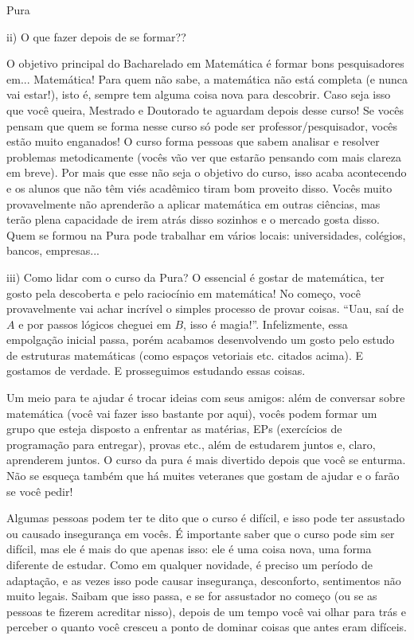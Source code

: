 \begin{subsecao}{Pura}
\begin{itemize}
\end{itemize}
ii) O que fazer depois de se formar??

O objetivo principal do Bacharelado em Matemática é formar bons pesquisadores
em... Matemática! Para quem não sabe, a matemática não está completa (e nunca
vai estar!), isto é, sempre tem alguma coisa nova para descobrir. Caso seja isso
que você queira, Mestrado e Doutorado te aguardam depois desse curso! Se vocês
pensam que quem se forma nesse curso só pode ser professor/pesquisador, vocês
estão muito enganados! O curso forma pessoas que sabem analisar e resolver problemas
metodicamente (vocês vão ver que estarão pensando com mais clareza em breve). Por
mais que esse não seja o objetivo do curso, isso acaba acontecendo e os alunos
que não têm viés acadêmico tiram bom proveito disso. Vocês muito provavelmente
não aprenderão a aplicar matemática em outras ciências, mas terão plena capacidade
de irem atrás disso sozinhos e o mercado gosta disso. Quem se formou na Pura pode
trabalhar em vários locais: universidades, colégios, bancos, empresas...

iii) Como lidar com o curso da Pura?
O essencial é gostar de matemática, ter gosto pela descoberta e pelo raciocínio
em matemática! No começo, você provavelmente vai achar incrível o simples processo
de provar coisas. ``Uau, saí de $A$ e por passos lógicos cheguei em $B$, isso é
magia!''. Infelizmente, essa empolgação inicial passa, porém acabamos desenvolvendo
um gosto pelo estudo de estruturas matemáticas (como espaços vetoriais etc.
citados acima). E gostamos de verdade. E prosseguimos estudando essas coisas.

Um meio para te ajudar é trocar ideias com seus amigos: além de conversar
sobre matemática (você vai fazer isso bastante por aqui), vocês podem formar um
grupo que esteja disposto a enfrentar as matérias, EPs (exercícios de
programação para entregar), provas etc., além de estudarem juntos e, claro,
aprenderem juntos. O curso da pura é mais divertido depois que você se enturma. Não se
esqueça também que há muites veteranes que gostam de ajudar e o farão se você pedir!

Algumas pessoas podem ter te dito que o curso é difícil, e isso pode ter assustado
ou causado insegurança em vocês. É importante saber que o curso pode sim ser difícil, mas
ele é mais do que apenas isso: ele é uma coisa nova, uma forma diferente de estudar. Como em 
qualquer novidade, é preciso um período de adaptação, e as vezes isso pode causar insegurança, 
desconforto, sentimentos não muito legais. Saibam que isso passa, e se for assustador no 
começo (ou se as pessoas te fizerem acreditar nisso), depois de um tempo você vai olhar
para trás e perceber o quanto você cresceu a ponto de dominar coisas que antes eram difíceis.


\end{subsecao}
